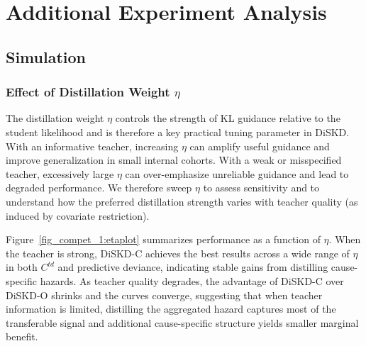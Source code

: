 \documentclass{article}
\theoremstyle{plain}
\theoremstyle{definition}
\theoremstyle{remark}
\begin{document}
\section{Additional Experiment Analysis}

\subsection{Simulation}

\subsubsection{Effect of Distillation Weight $\eta$}
\label{A.Sim.Eta}
The distillation weight $\eta$ controls the strength of KL guidance relative to the student likelihood and is therefore a key practical tuning parameter in DiSKD.
With an informative teacher, increasing $\eta$ can amplify useful guidance and improve generalization in small internal cohorts.
With a weak or misspecified teacher, excessively large $\eta$ can over-emphasize unreliable guidance and lead to degraded performance.
We therefore sweep $\eta$ to assess sensitivity and to understand how the preferred distillation strength varies with teacher quality (as induced by covariate restriction).


Figure~\ref{fig_compet_1:etaplot} summarizes performance as a function of $\eta$.
When the teacher is strong, DiSKD-C achieves the best results across a wide range of $\eta$ in both $C^{td}$ and predictive deviance, indicating stable gains from distilling cause-specific hazards.
As teacher quality degrades, the advantage of DiSKD-C over DiSKD-O shrinks and the curves converge, suggesting that when teacher information is limited, distilling the aggregated hazard captures most of the transferable signal and additional cause-specific structure yields smaller marginal benefit.
\end{document}
